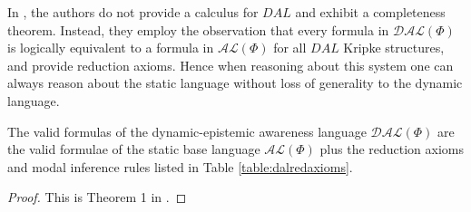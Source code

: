 In \cite{van_benthem_inference_2009}, the authors do not provide a
calculus for $DAL$ and exhibit a completeness theorem.  Instead, they
employ the observation that every formula in $\mathcal{DAL}(\Phi)$ is logically
equivalent to a formula in $\mathcal{AL}(\Phi)$ for all $DAL$ Kripke
structures, and provide reduction axioms.  Hence when reasoning about this system one can always
reason about the static language without loss of generality to the
dynamic language.

\begin{theorem}
The valid formulas of the dynamic-epistemic awareness
language $\mathcal{DAL}(\Phi)$ are the valid
formulae of the static base language $\mathcal{AL}(\Phi)$ plus the reduction
axioms and modal inference rules listed in Table
\ref{table:dalredaxioms}.
\end{theorem}
\begin{proof}
This is Theorem 1 in \cite{van_benthem_inference_2009}.
\end{proof}

